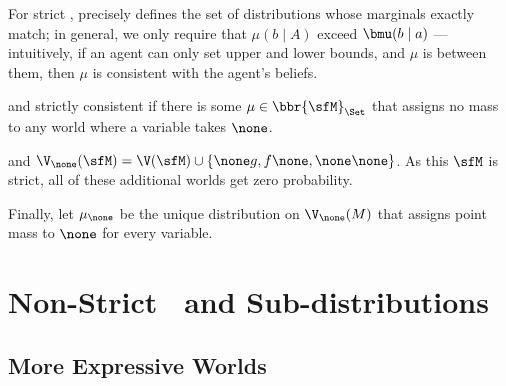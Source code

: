 







For strict \MNs,  precisely defines the set of distributions whose marginals exactly match; in general, we only require that $\mu(b \mid A)$ exceed $\bmu(b \mid a)$ --- intuitively, if an agent can only set upper and lower bounds, and $\mu$ is between them, then $\mu$ is consistent with the agent's beliefs. 

 and strictly consistent if there is some $\mu \in \bbr{\sfM}_\Set$ that assigns no mass to any world where a variable takes $\none$.


and $\V_\none(\sfM) = \V(\sfM) \cup \{ \none g, f \none, \none\none \}$. 
	As this $\sfM$ is strict, all of these additional worlds get zero probability. 
	
	Finally, let $\mu_\none$ be the unique distribution on $\V_\none(M)$ that assigns point mass to $\none$ for every variable.





\section{Non-Strict \MNs\ and Sub-distributions} \label{sec:full-model}




\subsection{More Expressive Worlds}
